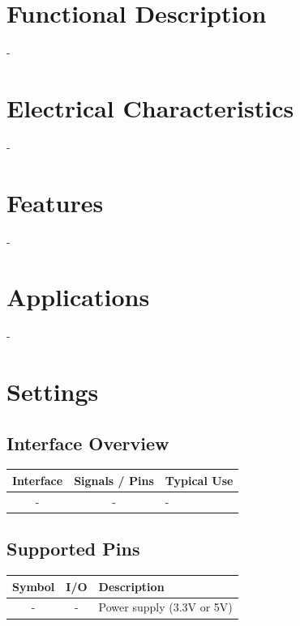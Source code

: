 \documentclass[10pt]{article}
\begin{document}
\vspace{1.0em}
\FloatBarrier %



\section*{Functional Description}
-\\ 

\section*{Electrical Characteristics}
-\\ 

\section*{Features}
-\\ 



\section*{Applications}
-\\ 

\vspace{1em}



\section*{Settings}

\subsection*{Interface Overview}
\begin{tabularx}{\textwidth}{|c|c|>{\RaggedRight\arraybackslash}X|}
\hline
\rowcolor{headergray}
Interface & Signals / Pins & Typical Use \\
\hline
- & - & - \\
\hline
\end{tabularx}


\subsection*{Supported Pins}
\begin{tabularx}{\textwidth}{|c|c|>{\RaggedRight\arraybackslash}X|}
\hline
\rowcolor{headergray}
Symbol & I/O & Description \\
\hline
- & - & Power supply (3.3V or 5V) \\
\hline
\end{tabularx}
\end{document}
